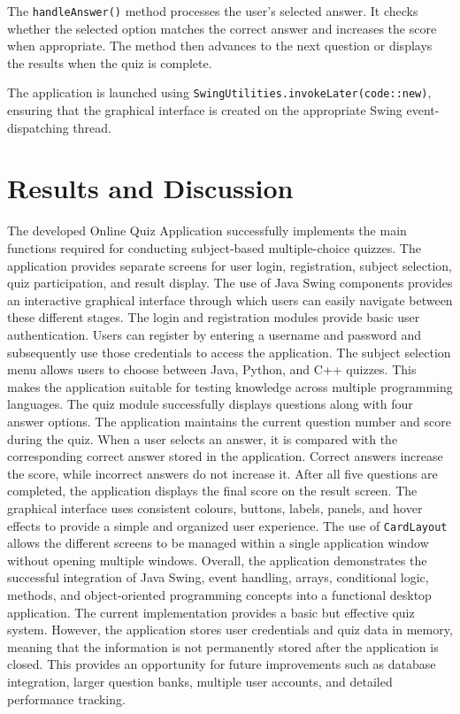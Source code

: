 \documentclass[11pt,a4paper]{report}  %
\begin{document}
The \texttt{handleAnswer()} method processes the user's selected answer. It checks whether the selected option matches the correct answer and increases the score when appropriate. The method then advances to the next question or displays the results when the quiz is complete.

The application is launched using \texttt{SwingUtilities.invokeLater(code::new)}, ensuring that the graphical interface is created on the appropriate Swing event-dispatching thread.


\section{Results and Discussion}
 The developed Online Quiz Application successfully implements the main functions required for conducting subject-based multiple-choice quizzes. The application provides separate screens for user login, registration, subject selection, quiz participation, and result display. The use of Java Swing components provides an interactive graphical interface through which users can easily navigate between these different stages.
The login and registration modules provide basic user authentication. Users can register by entering a username and password and subsequently use those credentials to access the application. The subject selection menu allows users to choose between Java, Python, and C++ quizzes. This makes the application suitable for testing knowledge across multiple programming languages.
The quiz module successfully displays questions along with four answer options. The application maintains the current question number and score during the quiz. When a user selects an answer, it is compared with the corresponding correct answer stored in the application. Correct answers increase the score, while incorrect answers do not increase it. After all five questions are completed, the application displays the final score on the result screen.
The graphical interface uses consistent colours, buttons, labels, panels, and hover effects to provide a simple and organized user experience. The use of \texttt{CardLayout} allows the different screens to be managed within a single application window without opening multiple windows.
Overall, the application demonstrates the successful integration of Java Swing, event handling, arrays, conditional logic, methods, and object-oriented programming concepts into a functional desktop application. The current implementation provides a basic but effective quiz system. However, the application stores user credentials and quiz data in memory, meaning that the information is not permanently stored after the application is closed. This provides an opportunity for future improvements such as database integration, larger question banks, multiple user accounts, and detailed performance tracking.
\end{document}
